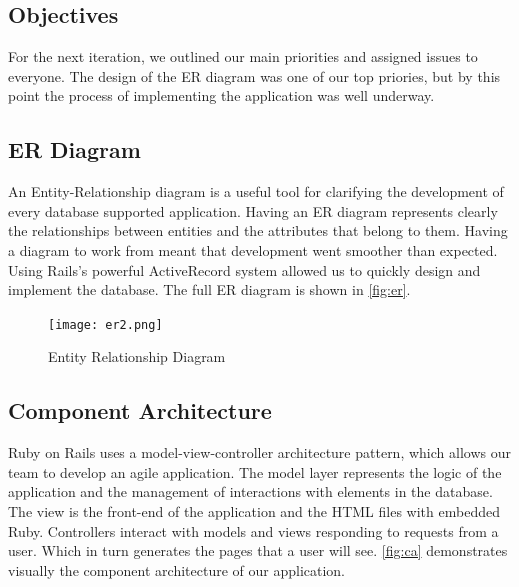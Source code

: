 \documentclass{l3proj}
\begin{document}
\subsection{Objectives}
\label{sec:design-objectives}

For the next iteration, we outlined our main priorities and assigned issues to everyone. The design of the ER diagram was one of our top priories, but by this point the process of implementing the application was well underway.

\subsection{ER Diagram}
\label{sec:er}

An Entity-Relationship diagram \cite{er} is a useful tool for clarifying the development of every database supported application. Having an ER diagram represents clearly the relationships between entities and the attributes that belong to them. Having a diagram to work from meant that development went smoother than expected. Using Rails's powerful ActiveRecord system allowed us to quickly design and implement the database. The full ER diagram is shown in \autoref{fig:er}.

\begin{figure}
\centerline{\texttt{[image: er2.png]}}
\caption{Entity Relationship Diagram}
\label{fig:er}
\end{figure}

\subsection{Component Architecture}
\label{sec:component}

Ruby on Rails uses a model-view-controller architecture pattern, which allows our team to develop an agile application. The model layer represents the logic of the application and the management of interactions with elements in the database. The view is the front-end of the application and the HTML files with embedded Ruby. Controllers interact with models and views responding to requests from a user. Which in turn generates the pages that a user will see.
\autoref{fig:ca} demonstrates visually the component architecture of our application.
\end{document}
